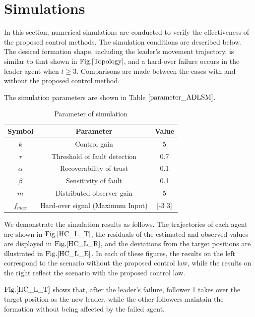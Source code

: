 \documentclass[a4paper,fleqn,10pt,twocolumn]{SICE_ISCS}
\begin{document}
\section{Simulations}
In this section, numerical simulations are conducted to verify the effectiveness of the proposed control methods. The simulation conditions are described below. The desired formation shape, including the leader's movement trajectory, is similar to that shown in \(\text{Fig.} \ref{Topology}\), and a hard-over failure occurs in the leader agent when \(t \geq 3\). Comparisons are made between the cases with and without the proposed control method.

The simulation parameters are shown in Table \(\ref{parameter_ADLSM}\).



\begin{table}[b]
	\begin{center}
		\caption{Parameter of simulation}
		\label{parameter_ADLSM}
		\begin{tabular}{c c c} \hline
			Symbol & Parameter & Value \\ \hline
			$k$ & Control gain & 5\\
			$\tau$ & Threshold of fault detection & 0.7\\
			$\alpha$ & Recoverability of trust & 0.1\\
			$\beta$ & Sensitivity of fault & 0.1\\ 
			$m$ & Distributed observer gain  & 5\\
			$f_{max}$ & Hard-over signal (Maximum Input) & [-3 3]\\ \hline
		\end{tabular}
	\end{center}
	\vspace{-1mm}
\end{table}

We demonstrate the simulation results as follows. The trajectories of each agent are shown in \(\text{Fig.} \ref{HC_L_T}\), the residuals of the estimated and observed values are displayed in \(\text{Fig.} \ref{HC_L_R}\), and the deviations from the target positions are illustrated in \(\text{Fig.} \ref{HC_L_E}\). In each of these figures, the results on the left correspond to the scenario without the proposed control law, while the results on the right reflect the scenario with the proposed control law. 

\(\text{Fig.} \ref{HC_L_T}\) shows that, after the leader's failure, follower 1 takes over the target position as the new leader, while the other followers maintain the formation without being affected by the failed agent. 
\end{document}
